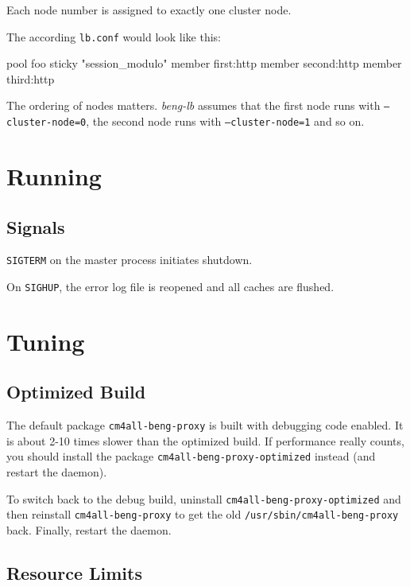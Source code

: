 \documentclass[a4paper,12pt]{article}
\begin{document}
Each node number is assigned to exactly one cluster node.

The according \texttt{lb.conf} would look like this:

\begin{verbatim*}
pool foo {
  sticky "session_modulo"
  member first:http
  member second:http
  member third:http
}
\end{verbatim*}

The ordering of nodes matters.  \emph{beng-lb} assumes that the first
node runs with \texttt{--cluster-node=0}, the second node runs with
\texttt{--cluster-node=1} and so on.

\section{Running}

\subsection{Signals}

\texttt{SIGTERM} on the master process initiates shutdown.

On \texttt{SIGHUP}, the error log file is reopened and all caches are
flushed.


\section{Tuning}

\subsection{Optimized Build}

The default package \texttt{cm4all-beng-proxy} is built with debugging
code enabled.  It is about 2-10 times slower than the optimized build.
If performance really counts, you should install the package
\texttt{cm4all\--beng\--proxy\--optimized} instead (and restart the
daemon).

To switch back to the debug build, uninstall
\texttt{cm4all\--beng\--proxy\--op\-ti\-mi\-zed} and then reinstall
\texttt{cm4all\--beng\--proxy} to get the old
\texttt{/usr/sbin/cm4all\--beng\--proxy} back.  Finally, restart the
daemon.

\subsection{Resource Limits}
\end{document}
